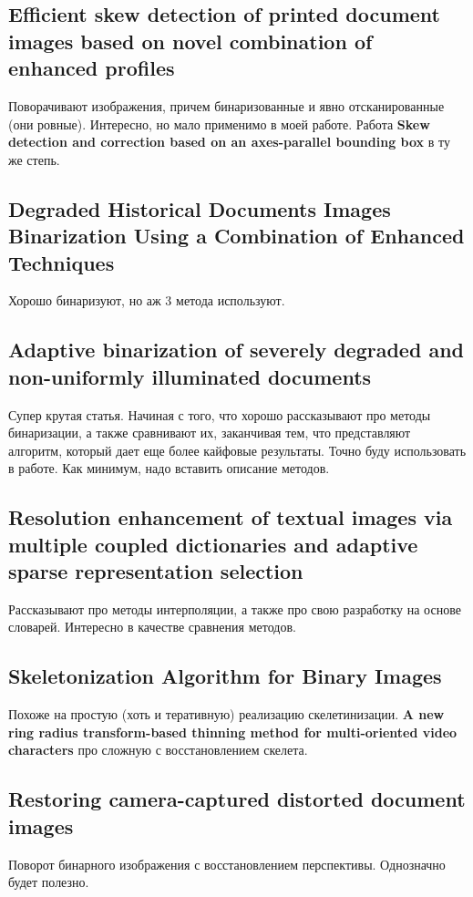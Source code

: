 \documentclass[12pt]{article}
\begin{document}
\subsection{Efficient skew detection of printed document images based on novel combination of enhanced profiles}
Поворачивают изображения, причем бинаризованные и явно отсканированные (они ровные). Интересно, но
мало применимо в моей работе. Работа \textbf{Skew detection and correction based on an axes-parallel bounding box}
в ту же степь.



\subsection{Degraded Historical Documents Images Binarization Using a Combination of Enhanced Techniques}
Хорошо бинаризуют, но аж 3 метода используют.


\subsection{Adaptive binarization of severely degraded and non-uniformly illuminated documents}
Супер крутая статья. Начиная с того, что хорошо рассказывают про методы бинаризации, а также сравнивают их,
заканчивая тем, что представляют алгоритм, который дает еще более кайфовые результаты. Точно буду использовать
в работе. Как минимум, надо вставить описание методов. 


\subsection{Resolution enhancement of textual images via multiple coupled 
dictionaries and adaptive sparse representation selection}
Рассказывают про методы интерполяции, а также про свою разработку на основе словарей. Интересно в качестве сравнения методов.


\subsection{Skeletonization Algorithm for Binary Images}
Похоже на простую (хоть и теративную) реализацию скелетинизации. \textbf{A new ring radius transform-based thinning method 
for multi-oriented video characters} про сложную с восстановлением скелета.


\subsection{Restoring camera-captured distorted document images}
Поворот бинарного изображения с восстановлением перспективы. Однозначно будет полезно.
\end{document}
